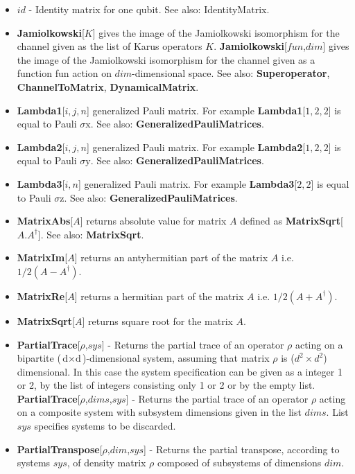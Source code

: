 \documentclass[a4paper,10pt]{scrartcl}
\begin{document}
\begin{itemize}
\item  $id$ - Identity matrix for one qubit. See also: IdentityMatrix.
\item  \textbf{Jamiolkowski}[$K$] gives the image of the Jamiolkowski isomorphism for the channel given as the list of Karus operators $K$. \newline{}
\textbf{Jamiolkowski}[$fun$,$dim$] gives the image of the Jamiolkowski isomorphism for the channel given as a function fun action on $dim$-dimensional space. See also: \textbf{Superoperator}, \textbf{ChannelToMatrix}, \textbf{DynamicalMatrix}.
\item  \textbf{Lambda1}[$i,j,n$] generalized Pauli matrix. For example \textbf{Lambda1}[$1,2,2$] is equal to Pauli $\text{$\sigma $x}$. See also: \textbf{GeneralizedPauliMatrices}.
\item  \textbf{Lambda2}[$i,j,n$] generalized Pauli matrix. For example \textbf{Lambda2}[$1,2,2$] is equal to Pauli $\text{$\sigma $y}$. See also: \textbf{GeneralizedPauliMatrices}.
\item  \textbf{Lambda3}[$i,n$] generalized Pauli matrix. For example \textbf{Lambda3}[$2,2$] is equal to Pauli $\text{$\sigma $z}$. See also: \textbf{GeneralizedPauliMatrices}.
\item  \textbf{MatrixAbs}[$A$] returns absolute value for matrix $A$ defined as \textbf{MatrixSqrt}[$A.A^{\dagger }$]. See also: \textbf{MatrixSqrt}.
\item  \textbf{MatrixIm}[$A$] returns an antyhermitian part of the matrix $A$ i.e. $1/2(A-A^{\dagger })$.
\item  \textbf{MatrixRe}[$A$] returns a hermitian part of the matrix $A$ i.e. $1/2(A+A^{\dagger })$.
\item  \textbf{MatrixSqrt}[$A$] returns square root for the matrix $A$.
\item  \textbf{PartialTrace}[$\rho$,$sys$] - Returns the partial trace of an operator $\rho$ acting on a bipartite ($\text{d$\times $d}$)-dimensional system, assuming that matrix $\rho$ is ($d^2\times d^2$) dimensional. In this case the system specification can be given as a integer 1 or 2, by the list of integers consisting only 1 or 2 or by the empty list. \newline{}
\textbf{PartialTrace}[$\rho$,$dims$,$sys$] - Returns the partial trace of an operator $\rho$ acting on a composite system with subsystem dimensions given in the list $dims$. List $sys$ specifies systems to be discarded.
\item  \textbf{PartialTranspose}[$\rho$,$dim$,$sys$] - Returns the partial transpose, according to systems $sys$, of density matrix $\rho$ composed of subsystems of dimensions $dim$.

\end{itemize}
\end{document}

